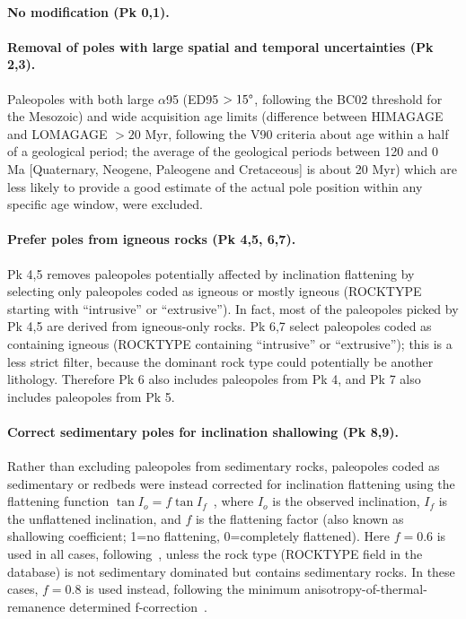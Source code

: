 \paragraph{No modification (Pk 0,1).}

\paragraph{Removal of poles with large spatial and temporal uncertainties
(Pk 2,3).} Paleopoles with both large $\alpha$95 (ED95 $>15\degree$,
following the BC02 threshold for the Mesozoic) and wide acquisition age limits
(difference between HIMAGAGE and LOMAGAGE $>20$ Myr, following the V90 criteria
about age within a half of a geological period; the average of the geological
periods between 120 and 0 Ma [Quaternary, Neogene, Paleogene and Cretaceous] is
about 20 Myr) which are less likely to provide a good estimate of the actual
pole position within any specific age window, were excluded.

\paragraph{Prefer poles from igneous rocks (Pk 4,5, 6,7).} Pk 4,5 removes
paleopoles potentially affected by inclination flattening by selecting only
paleopoles coded as igneous or mostly igneous (ROCKTYPE starting with
``intrusive'' or ``extrusive''). In fact, most of the paleopoles picked by Pk
4,5 are derived from igneous-only rocks. Pk 6,7 select paleopoles coded as
containing igneous (ROCKTYPE containing ``intrusive'' or ``extrusive''); this is
a less strict filter, because the dominant rock type could potentially be
another lithology. Therefore Pk 6 also includes paleopoles from Pk 4, and Pk 7
also includes paleopoles from Pk 5.

\paragraph{Correct sedimentary poles for inclination shallowing (Pk 8,9).}
Rather than excluding paleopoles from sedimentary rocks, paleopoles coded as
sedimentary or redbeds were instead corrected for inclination flattening using
the flattening function $\tan I_o = f \tan I_f$~\citep{K55}, where $I_o$ is the
observed inclination, $I_f$ is the unflattened inclination, and $f$ is the
flattening factor (also known as shallowing coefficient; 1=no flattening,
0=completely flattened). Here $f=0.6$ is used in all cases,
following~\citet{T12}, unless the rock type (ROCKTYPE field in the database) is
not sedimentary dominated but contains sedimentary rocks. In these cases,
$f=0.8$ is used instead, following the minimum anisotropy-of-thermal-remanence
determined f-correction~\citep{D11,Do11}.

